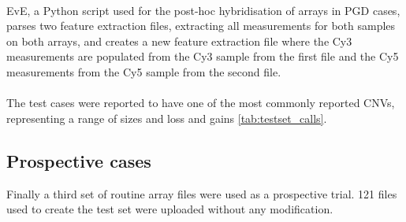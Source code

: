 \paragraph*{}
EvE, a Python script used for the post-hoc hybridisation of arrays in \ac{PGD} cases, parses two feature extraction files, extracting all measurements for both samples on both arrays, and creates a new feature extraction file where the Cy3 measurements are populated from the Cy3 sample from the first file and the Cy5 measurements from the Cy5 sample from the second file.

\paragraph*{}
The test cases were reported to have one of the most commonly reported CNVs, representing a range of sizes and loss and gains \ref{tab:testset_calls}.

\begin{table}
\caption{Cases with one of the 9 most common CNV were used to create the test set}
\label{tab:testset_calls}
\end{table}

\subsection{Prospective cases}
Finally a third set of routine array files were used as a prospective trial. 
121 files used to create the test set were uploaded without any modification.

